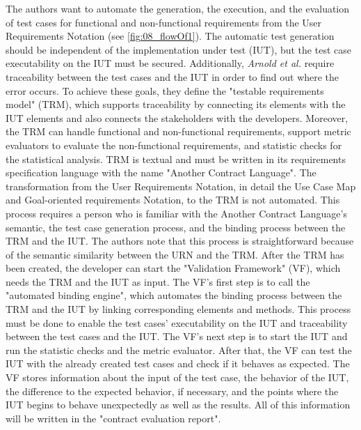 The authors want to automate the generation, the execution, and the evaluation of test cases for functional and non-functional requirements from the User Requirements Notation (see \autoref{fig:08_flowOf1}). The automatic test generation should be independent of the implementation under test (IUT), but the test case executability on the IUT must be secured. Additionally, \textit{Arnold et al.} require traceability between the test cases and the IUT in order to find out where the error occurs. To achieve these goals, they define the "testable requirements model" (TRM), which supports traceability by connecting its elements with the IUT elements and also connects the stakeholders with the developers. Moreover, the TRM can handle functional and non-functional requirements, support metric evaluators to evaluate the non-functional requirements, and statistic checks for the statistical analysis. TRM is textual and must be written in its requirements specification language with the name "Another Contract Language". The transformation from the User Requirements Notation, in detail the Use Case Map and Goal-oriented requirements Notation, to the TRM is not automated. This process requires a person who is familiar with the Another Contract Language's semantic, the test case generation process, and the binding process between the TRM and the IUT. The authors note that this process is straightforward because of the semantic similarity between the URN and the TRM. After the TRM has been created, the developer can start the "Validation Framework" (VF), which needs the TRM and the IUT as input. The VF's first step is to call the "automated binding engine", which automates the binding process between the TRM and the IUT by linking corresponding elements and methods. This process must be done to enable the test cases' executability on the IUT and traceability between the test cases and the IUT. The VF's next step is to start the IUT and run the statistic checks and the metric evaluator. After that, the VF can test the IUT with the already created test cases and check if it behaves as expected. The VF stores information about the input of the test case, the behavior of the IUT, the difference to the expected behavior, if necessary, and the points where the IUT begins to behave unexpectedly as well as the results. All of this information will be written in the "contract evaluation report".

